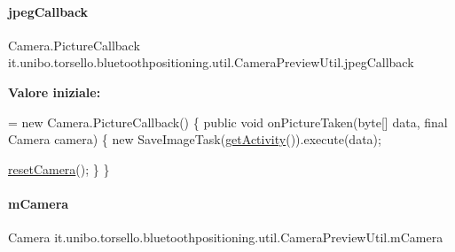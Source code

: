 \paragraph{\texorpdfstring{jpeg\+Callback}{jpegCallback}}
{\footnotesize\ttfamily Camera.\+Picture\+Callback it.\+unibo.\+torsello.\+bluetoothpositioning.\+util.\+Camera\+Preview\+Util.\+jpeg\+Callback\hspace{0.3cm}{\ttfamily [package]}}

{\bfseries Valore iniziale\+:}
\begin{DoxyCode}
= \textcolor{keyword}{new} Camera.PictureCallback() \{
        \textcolor{keyword}{public} \textcolor{keywordtype}{void} onPictureTaken(byte[] data, \textcolor{keyword}{final} Camera camera) \{
            \textcolor{keyword}{new} SaveImageTask(\hyperlink{classit_1_1unibo_1_1torsello_1_1bluetoothpositioning_1_1util_1_1CameraPreviewUtil_a3a4253aa9b4df3659a6f7bb80be84256_a3a4253aa9b4df3659a6f7bb80be84256}{getActivity}()).execute(data);

            \hyperlink{classit_1_1unibo_1_1torsello_1_1bluetoothpositioning_1_1util_1_1CameraPreviewUtil_a5240e32d2ccac682cf80c639accea5da_a5240e32d2ccac682cf80c639accea5da}{resetCamera}();
        \}
    \}
\end{DoxyCode}
\hypertarget{classit_1_1unibo_1_1torsello_1_1bluetoothpositioning_1_1util_1_1CameraPreviewUtil_a7ee402da8ec64412f9a68e68b4025eea_a7ee402da8ec64412f9a68e68b4025eea}{}\label{classit_1_1unibo_1_1torsello_1_1bluetoothpositioning_1_1util_1_1CameraPreviewUtil_a7ee402da8ec64412f9a68e68b4025eea_a7ee402da8ec64412f9a68e68b4025eea} 
\paragraph{\texorpdfstring{m\+Camera}{mCamera}}
{\footnotesize\ttfamily Camera it.\+unibo.\+torsello.\+bluetoothpositioning.\+util.\+Camera\+Preview\+Util.\+m\+Camera\hspace{0.3cm}{\ttfamily [private]}}

\hypertarget{classit_1_1unibo_1_1torsello_1_1bluetoothpositioning_1_1util_1_1CameraPreviewUtil_ad2698fd1398d4a6491b1e0b071a956db_ad2698fd1398d4a6491b1e0b071a956db}{}\label{classit_1_1unibo_1_1torsello_1_1bluetoothpositioning_1_1util_1_1CameraPreviewUtil_ad2698fd1398d4a6491b1e0b071a956db_ad2698fd1398d4a6491b1e0b071a956db} 
